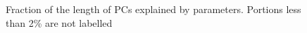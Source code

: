 \begin{figure}[ht!]
    \begin{center}
    \end{center}

    \caption[Fraction of the length of PCs explained by parameters]{Fraction of the length of PCs explained by parameters. Portions less than 2\% are not labelled}
    \label{fig:pc_pie}
\end{figure}

